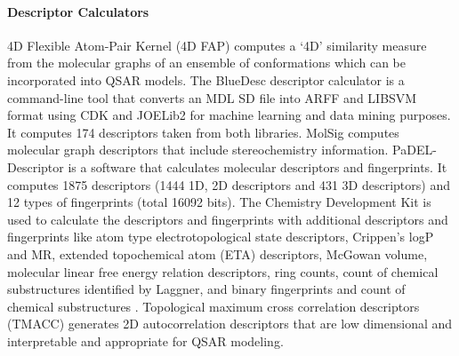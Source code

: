 \paragraph{Descriptor Calculators}
4D Flexible Atom-Pair Kernel (4D FAP) computes a `4D' similarity measure from the molecular graphs of an ensemble of conformations which can be incorporated into QSAR models.
The BlueDesc descriptor calculator is a command-line tool that converts an MDL SD file into ARFF and LIBSVM format using CDK and JOELib2 for machine learning and data mining purposes. It computes 174 descriptors taken from both libraries.
MolSig \cite{Carbonell_2013} computes molecular graph descriptors that include stereochemistry information.
PaDEL-Descriptor  \cite{Yap_2010} is a software that calculates molecular descriptors and fingerprints. It computes 1875 descriptors (1444 1D, 2D descriptors and 431 3D descriptors) and 12 types of fingerprints (total 16092 bits). The Chemistry Development Kit is used to calculate the descriptors and fingerprints with additional descriptors and fingerprints like atom type electrotopological state descriptors, Crippen's logP and MR, extended topochemical atom (ETA) descriptors, McGowan volume, molecular linear free energy relation descriptors, ring counts, count of chemical substructures identified by Laggner, and binary fingerprints and count of chemical substructures \cite{Yap_2010}.
Topological maximum cross correlation descriptors (TMACC) \cite{Melville_2007} generates 2D autocorrelation descriptors that are low dimensional and interpretable and appropriate for QSAR modeling.

